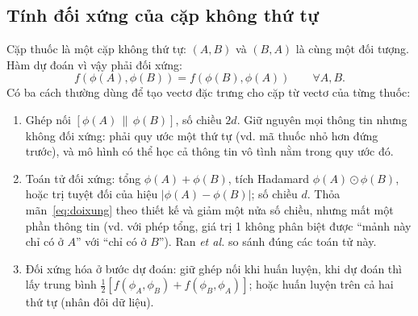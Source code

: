 \documentclass[12pt,a4paper,oneside]{report}
\begin{document}
\subsection{Tính đối xứng của cặp không thứ tự}
Cặp thuốc là một cặp không thứ tự: $(A, B)$ và $(B, A)$ là cùng một đối
tượng. Hàm dự đoán vì vậy phải đối xứng:
\begin{equation}
  f(\phi(A), \phi(B)) = f(\phi(B), \phi(A)) \qquad \forall A, B .
  \label{eq:doixung}
\end{equation}
Có ba cách thường dùng để tạo vectơ đặc trưng cho cặp từ vectơ của từng thuốc:
\begin{enumerate}
  \item Ghép nối $[\phi(A) \,\|\, \phi(B)]$, số chiều $2d$. Giữ nguyên
        mọi thông tin nhưng không đối xứng: phải quy ước một thứ tự (vd.
        mã thuốc nhỏ hơn đứng trước), và mô hình có thể học cả thông tin vô tình
        nằm trong quy ước đó.
  \item Toán tử đối xứng: tổng $\phi(A) + \phi(B)$, tích Hadamard
        $\phi(A) \odot \phi(B)$, hoặc trị tuyệt đối của hiệu
        $|\phi(A) - \phi(B)|$; số chiều $d$. Thỏa mãn~\eqref{eq:doixung} theo
        thiết kế và giảm một nửa số chiều, nhưng mất một phần thông tin (vd. với
        phép tổng, giá trị 1 không phân biệt được ``mảnh này chỉ có ở $A$'' với
        ``chỉ có ở $B$''). Ran \textit{et al.} \cite{ran2022} so sánh đúng các
        toán tử này.
  \item Đối xứng hóa ở bước dự đoán: giữ ghép nối khi huấn luyện, khi
        dự đoán thì lấy trung bình $\tfrac{1}{2}[f(\phi_A, \phi_B) +
        f(\phi_B, \phi_A)]$; hoặc huấn luyện trên cả hai thứ tự (nhân đôi dữ
        liệu).
\end{enumerate}
\end{document}
